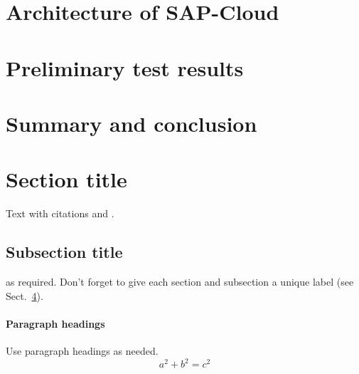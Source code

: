 \documentclass[twocolumn]{svjour3}          %
\begin{document}
\section{Architecture of SAP-Cloud}

\section{Preliminary test results}

\section{Summary and conclusion}

\section{Section title}
\label{sec:1}
Text with citations \cite{RefB} and \cite{RefJ}.
\subsection{Subsection title}
\label{sec:2}
as required. Don't forget to give each section
and subsection a unique label (see Sect.~\ref{sec:1}).
\paragraph{Paragraph headings} Use paragraph headings as needed.
\begin{equation}
a^2+b^2=c^2
\end{equation}

%
%
\end{document}
